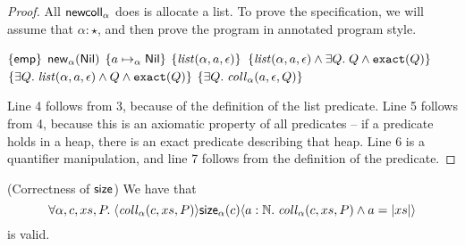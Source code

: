 \begin{proof}
All $\mathsf{newcoll}_\alpha$ does is allocate a list. To prove the
specification, we will assume that $\alpha:\star$, and then prove the
program in annotated program style.

\begin{specification}
\nextline $\{{\mathsf{emp}}\}$ 
\nextline $\mathsf{new}_{\alpha}(\mathsf{Nil})$ 
\nextline $\{{a \mapsto_\alpha \mathsf{Nil}}\}$ 
\nextline $\{{\mathit{list}(\alpha, a, \epsilon)}\}$ 
\nextline $\{{\mathit{list}(\alpha, a, \epsilon) \land \exists Q.\; Q \land \mathtt{exact}({Q})}\}$ 
\nextline $\{{\exists Q.\;\mathit{list}(\alpha, a, \epsilon) \land Q \land \mathtt{exact}({Q})}\}$ 
\nextline $\{{\exists Q.\; \mathit{coll}_\alpha(a, \epsilon, Q)}\}$ 
\end{specification}

Line 4 follows from 3, because of the definition of the list predicate. Line 5 
follows from 4, because this is an axiomatic property of all predicates -- if
a predicate holds in a heap, there is an exact predicate describing that heap. Line 6 
is a quantifier manipulation, and line 7 follows from the definition of the predicate.
\end{proof}

\begin{lemma}{(Correctness of $\mathsf{size}$)}
We have that 
\begin{displaymath}
\forall \alpha, c, xs, P.\; \langle{\mathit{coll}_\alpha(c, xs, P)}\rangle{\mathsf{size}_\alpha(c)}\langle{a:\mathbb{N}}.\;{\mathit{coll}_\alpha(c, xs, P) \land a = |xs|}\rangle
\end{displaymath}
is valid.   
\end{lemma}

